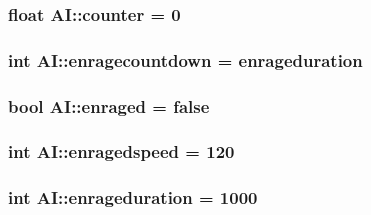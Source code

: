 \subsubsection[{\texorpdfstring{counter}{counter}}]{\setlength{\rightskip}{0pt plus 5cm}float A\+I\+::counter = 0\hspace{0.3cm}{\ttfamily [protected]}}\hypertarget{classAI_af56d250c7efc5f36915193949d87be21}{}\label{classAI_af56d250c7efc5f36915193949d87be21}
\subsubsection[{\texorpdfstring{enragecountdown}{enragecountdown}}]{\setlength{\rightskip}{0pt plus 5cm}int A\+I\+::enragecountdown = {\bf enrageduration}\hspace{0.3cm}{\ttfamily [protected]}}\hypertarget{classAI_a155447249032f20011edefe8be3d081d}{}\label{classAI_a155447249032f20011edefe8be3d081d}
\subsubsection[{\texorpdfstring{enraged}{enraged}}]{\setlength{\rightskip}{0pt plus 5cm}bool A\+I\+::enraged = false\hspace{0.3cm}{\ttfamily [protected]}}\hypertarget{classAI_a0b809846d43813799b3e44c42114e9a1}{}\label{classAI_a0b809846d43813799b3e44c42114e9a1}
\subsubsection[{\texorpdfstring{enragedspeed}{enragedspeed}}]{\setlength{\rightskip}{0pt plus 5cm}int A\+I\+::enragedspeed = 120\hspace{0.3cm}{\ttfamily [protected]}}\hypertarget{classAI_af6b753eddb25c163d5b359420b314d4e}{}\label{classAI_af6b753eddb25c163d5b359420b314d4e}
\subsubsection[{\texorpdfstring{enrageduration}{enrageduration}}]{\setlength{\rightskip}{0pt plus 5cm}int A\+I\+::enrageduration = 1000\hspace{0.3cm}{\ttfamily [protected]}}\hypertarget{classAI_a2e89055bd6a91949269c76ec94017194}{}\label{classAI_a2e89055bd6a91949269c76ec94017194}
